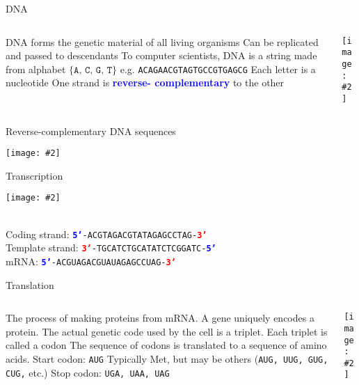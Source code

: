 \documentclass{beamer}
\renewcommand{\c}[1]{\begin{center}#1\end{center}}
\newcommand{\blu}[1]{\textcolor{blue}{\textbf{#1}}}
\newcommand{\red}[1]{\textcolor{red}{\textbf{#1}}}
\newcommand{\gr}[2][.95]{\c{\texttt{[image: \#2]}}}
\begin{document}
\begin{frame}{DNA}
\begin{columns}
\begin{column}{0.6\textwidth}
    \begin{outline}
        \1 DNA forms the genetic material of all living organisms
            \2 Can be replicated and passed to descendants
        \1 To computer scientists, DNA is a string made from alphabet $\{\texttt{A, C, G, T}\}$
            \2 e.g. \texttt{ACAGAACGTAGTGCCGTGAGCG}
        \1 Each letter is a nucleotide
        \1 One strand is \blu{reverse- complementary} to the other
    \end{outline}
\end{column}
\begin{column}{0.4\textwidth}
    \gr{l1_figs/s11_dnastrand.png}
\end{column}
\end{columns}
\end{frame}

\begin{frame}{Reverse-complementary DNA sequences}
\gr{l1_figs/s12_rc.png}
\end{frame}

\begin{frame}{Transcription}
\c{
    \gr{l1_figs/s13_transcription.png}\\

    Coding strand:      \hfill \texttt{\blu{5’}-ACGTAGACGTATAGAGCCTAG-\red{3’}}\\
    Template strand:    \hfill \texttt{\red{3’}-TGCATCTGCATATCTCGGATC-\blu{5’}}\\
    mRNA:               \hfill \texttt{\blu{5’}-ACGUAGACGUAUAGAGCCUAG-\red{3’}}
}
\end{frame}

\begin{frame}{Translation}
\begin{columns}
\begin{column}{0.6\textwidth}

\begin{outline}
    \1 The process of making proteins from mRNA.
    \1 A gene uniquely encodes a protein.
    \1 The actual genetic code used by the cell is a triplet.
        \2 Each triplet is called a codon
    \1 The sequence of codons is translated to a sequence of amino acids.
    \1 Start codon: \texttt{AUG}
        \2 Typically Met, but may be others (\texttt{AUG, UUG, GUG, CUG,} etc.)
        \2 Stop codon: \texttt{UGA, UAA, UAG}
\end{outline}

\end{column}
\begin{column}{0.4\textwidth}
    \gr{l1_figs/s14_codons.png}
\end{column}
\end{columns}
\end{frame}
\end{document}
